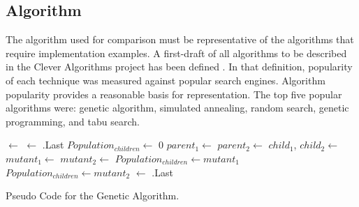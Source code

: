 \documentclass[a4paper, 11pt]{article}
\begin{document}
% 
% 
\subsection{Algorithm}
The algorithm used for comparison must be representative of the algorithms that require implementation examples. A first-draft of all algorithms to be described in the Clever Algorithms project has been defined \cite{Brownlee2010a}. In that definition, popularity of each technique was measured against popular search engines. Algorithm popularity provides a reasonable basis for representation. The top five popular algorithms were: genetic algorithm, simulated annealing, random search, genetic programming, and tabu search.

\begin{algorithm}[htp]
  \SetLine  
  
  
  \KwOut{\Best}
  	
	\Pop $\leftarrow$ \InitializeRandomBitstrings{\PopSize, \Length}\;
	 {
	 	\;
	 }
	\Best $\leftarrow$ .Last\;
	\While{$\neg$\StopCondition{}}
	{
	 $Population_{children} \leftarrow$ 0\;
	{
		$parent_1 \leftarrow$ \TournamentSelection{\Pop, \BoutSize}\;
		$parent_2 \leftarrow$ \TournamentSelection{\Pop, \BoutSize}\;
		$child_1$, $child_2 \leftarrow$ \;
		$mutant_1 \leftarrow$ \;
		$mutant_2 \leftarrow$ \;
		$Population_{children} \leftarrow mutant_1$\;
		$Population_{children} \leftarrow mutant_2$\;
	}
	 {
	 	\;
	 }
	 \Best $\leftarrow$ .Last\;
	 \;	 
	}
	\Return{\Best}\;
	
	\caption{Pseudo Code for the Genetic Algorithm.}
	\label{alg:genetic_algorithm}
\end{algorithm}
\end{document}
